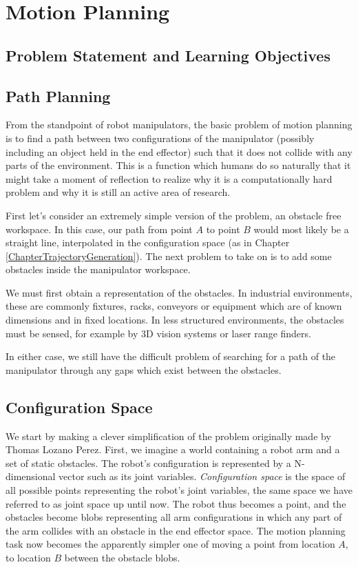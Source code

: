 %

\chapter{Motion Planning}

\section{Problem Statement and Learning Objectives}



\section{Path Planning}
From the standpoint of robot manipulators, the basic problem of motion planning is to find a   path between two configurations of the manipulator (possibly including an object held in the end effector) such that it does not collide with any parts of the environment.  This is a function which humans do so naturally that it might take a moment of reflection to realize why it is a computationally hard problem and why it is still an active area of research.  

First let's consider an extremely simple version of the problem, an obstacle free workspace.   In this case, our path from point $A$ to point $B$ would most likely be a straight line, interpolated in the configuration space (as in Chapter \ref{ChapterTrajectoryGeneration}).  The next problem to take on is to add some obstacles  inside the manipulator workspace.

We must first obtain a representation of the obstacles.   In industrial environments, these are commonly fixtures, racks, conveyors or equipment which are of known dimensions and in fixed locations.   In less structured environments, the obstacles must be sensed, for example by 3D vision systems or laser range finders. 

In either case, we still have the difficult problem of searching for a path of the manipulator through any gaps which exist between the obstacles. 

\section{Configuration Space}

We start by making a clever simplification of the problem originally made by Thomas Lozano Perez.  First, we imagine a world containing a robot arm and a set of static obstacles.  The robot's configuration is represented by a N-dimensional vector such as its joint variables.  \textit{Configuration space} is the space of all possible points representing the robot's joint variables, the same space we have referred to as joint space up until now.   The robot thus becomes a point, and the obstacles become blobs representing all arm configurations in which any part of the arm collides with an obstacle in the end effector space.  The  motion planning task now becomes the apparently simpler one of moving a point from location $A$, to location $B$ between the obstacle blobs.  


